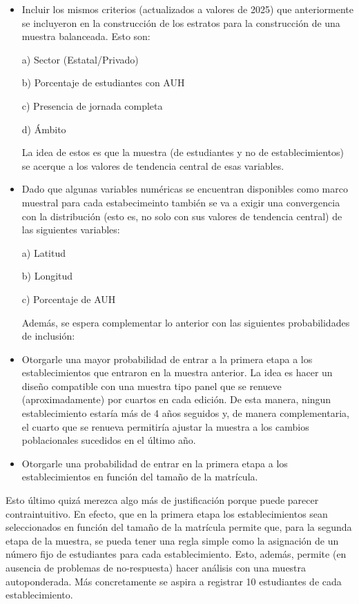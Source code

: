 \documentclass[
  spanish,
  a4paper,
]{scrreprt}
\begin{document}
\begin{itemize}
\item
  Incluir los mismos criterios (actualizados a valores de 2025) que
  anteriormente se incluyeron en la construcción de los estratos para la
  construcción de una muestra balanceada. Esto son:

  a) Sector (Estatal/Privado)

  b) Porcentaje de estudiantes con AUH

  c) Presencia de jornada completa

  d) Ámbito

  La idea de estos es que la muestra (de estudiantes y no de
  establecimientos) se acerque a los valores de tendencia central de
  esas variables.
\item
  Dado que algunas variables numéricas se encuentran disponibles como
  marco muestral para cada estabecimeinto también se va a exigir una
  convergencia con la distribución (esto es, no solo con sus valores de
  tendencia central) de las siguientes variables:

  a) Latitud

  b) Longitud

  c) Porcentaje de AUH

  Además, se espera complementar lo anterior con las siguientes
  probabilidades de inclusión:
\item
  Otorgarle una mayor probabilidad de entrar a la primera etapa a los
  establecimientos que entraron en la muestra anterior. La idea es hacer
  un diseño compatible con una muestra tipo panel que se renueve
  (aproximadamente) por cuartos en cada edición. De esta manera, ningun
  establecimiento estaría más de 4 años seguidos y, de manera
  complementaria, el cuarto que se renueva permitiría ajustar la muestra
  a los cambios poblacionales sucedidos en el último año.
\item
  Otorgarle una probabilidad de entrar en la primera etapa a los
  establecimientos en función del tamaño de la matrícula.
\end{itemize}

\noindent Esto último quizá merezca algo más de justificación porque
puede parecer contraintuitivo. En efecto, que en la primera etapa los
establecimientos sean seleccionados en función del tamaño de la
matrícula permite que, para la segunda etapa de la muestra, se pueda
tener una regla simple como la asignación de un número fijo de
estudiantes para cada establecimiento. Esto, además, permite (en
ausencia de problemas de no-respuesta) hacer análisis con una muestra
autoponderada. Más concretamente se aspira a registrar 10 estudiantes de
cada establecimiento.
\end{document}

